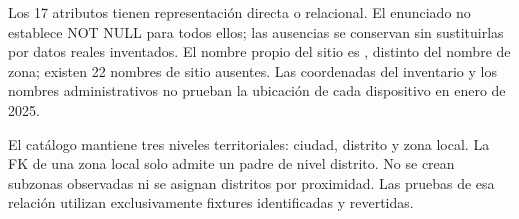 Los 17 atributos tienen representación directa o relacional. El enunciado no
establece NOT NULL para todos ellos; las ausencias se conservan sin sustituirlas
por datos reales inventados. El nombre propio del sitio es
, distinto del nombre de zona; existen 22 nombres de sitio
ausentes. Las coordenadas del inventario y los nombres administrativos no prueban
la ubicación de cada dispositivo en enero de 2025.

El catálogo mantiene tres niveles territoriales: ciudad, distrito y zona local.
La FK de una zona local solo admite un padre de nivel distrito. No se crean
subzonas observadas ni se asignan distritos por proximidad. Las pruebas de esa
relación utilizan exclusivamente fixtures identificadas y revertidas.
